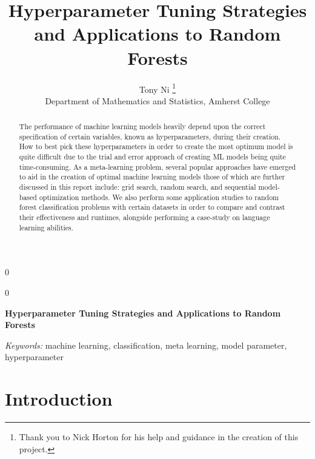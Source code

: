 \documentclass[12pt]{article}
\newcommand{\blind}{0}
\begin{document}
\def\spacingset#1{\renewcommand{\baselinestretch}%
{#1}\small\normalsize} \spacingset{1}



\blind
{
  \title{\bf Hyperparameter Tuning Strategies and Applications to Random
Forests}

  \author{
        Tony Ni \thanks{Thank you to Nick Horton for his help and
guidance in the creation of this project.} \\
    Department of Mathematics and Statistics, Amherst College\\
      }
  \maketitle
} \fi

\blind
{
  \bigskip
  \bigskip
  \bigskip
  \begin{center}
    {\LARGE\bf Hyperparameter Tuning Strategies and Applications to
Random Forests}
  \end{center}
  \medskip
} \fi

\bigskip
\begin{abstract}
The performance of machine learning models heavily depend upon the
correct specification of certain variables, known as hyperparameters,
during their creation. How to best pick these hyperparameters in order
to create the most optimum model is quite difficult due to the trial and
error approach of creating ML models being quite time-consuming. As a
meta-learning problem, several popular approaches have emerged to aid in
the creation of optimal machine learning models those of which are
further discussed in this report include: grid search, random search,
and sequential model-based optimization methods. We also perform some
application studies to random forest classification problems with
certain datasets in order to compare and contrast their effectiveness
and runtimes, alongside performing a case-study on language learning
abilities.
\end{abstract}

\noindent%
{\it Keywords:} machine learning, classification, meta learning, model
parameter, hyperparameter
\vfill

\newpage
\spacingset{1.45} %

\hypertarget{introduction}{%
\section{Introduction}\label{introduction}}
\end{document}
